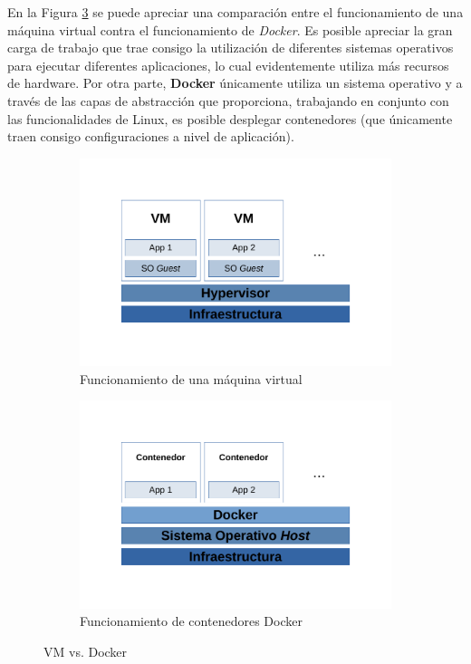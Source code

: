\documentclass[12pt, letterpaper]{article}
\begin{document}
En la Figura \ref{fig:vm-vs-docker} se puede apreciar una comparación entre el 
funcionamiento de una máquina virtual contra el funcionamiento de 
\textit{Docker}. Es posible apreciar la gran carga de trabajo que trae consigo 
la utilización de diferentes sistemas operativos para ejecutar diferentes 
aplicaciones, lo cual evidentemente utiliza más recursos de hardware. Por otra 
parte, \textbf{Docker} únicamente utiliza un sistema operativo y a través de 
las capas de abstracción que proporciona, trabajando en conjunto con las 
funcionalidades de Linux, es posible desplegar contenedores (que únicamente 
traen consigo configuraciones a nivel de aplicación).

\begin{figure}[H]
  \centering
  \begin{subfigure}[b]{0.45\textwidth}
    \centering
    \includegraphics[width=\textwidth]{vm-schema}
    \caption{Funcionamiento de una máquina virtual}
    \label{fig:vm-schema}
  \end{subfigure}
  \begin{subfigure}[b]{0.45\textwidth}
    \centering
    \includegraphics[width=\textwidth]{container-schema}
    \caption{Funcionamiento de contenedores Docker}
    \label{fig:container-schema}
  \end{subfigure}
  \caption{VM vs. Docker}
  \label{fig:vm-vs-docker}
\end{figure}
\end{document}
